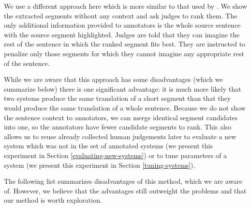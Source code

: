 We use a different approach here which is more similar to that used by
. We show the extracted segments without any context
and ask judges to rank them. The only additional information provided to
annotators is the whole source sentence with the source segment highlighted.
Judges are told that they can imagine the rest of the sentence in which the
ranked segment fits best. They are instructed to penalize only those segments
for which they cannot imagine any appropriate rest of the sentence.

While we are aware that this approach has some disadvantages (which we
summarize below) there is one significant advantage: it is much more likely
that two systems produce the same translation of a short segment than that they
would produce the same translation of a whole sentence. Because we do not show
the sentence context to annotators, we can merge identical segment candidates
into one, so the annotators have fewer candidate segments to rank. This also
allows us to reuse already collected human judgements later to evaluate a new
system which was not in the set of annotated systems (we present this
experiment in Section \ref{evaluating-new-systems}) or to tune parameters
of a system (we present this experiment in Section \ref{tuning-systems}).

The following list summarizes disadvantages of this method, which we are aware
of. However, we believe that the advantages still outweight the problems
and that our method is worth exploration.

